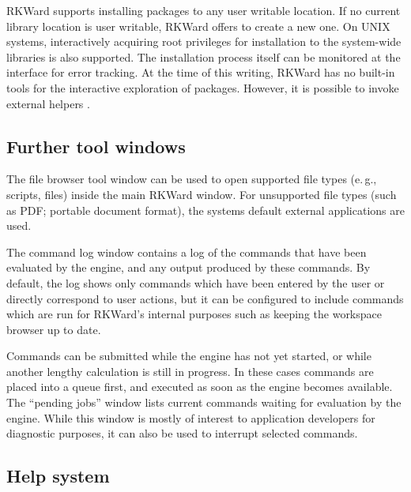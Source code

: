 RKWard supports installing packages to any user writable location. If no current
library location is user writable, RKWard offers to create a new one. 
On UNIX systems, interactively acquiring root privileges for
installation to the system-wide libraries is also supported.
The installation process
itself can be monitored at the interface for error tracking. At the time of this writing, RKWard has no
built-in tools for the interactive exploration of  packages. However, it is
possible to invoke external helpers \citep{Zhang2004}.

\subsection{Further tool windows}
\label{sec:further_tool_windows}

The file browser tool window can be
used to open supported file types (e.\,g., 
scripts,  files) inside the main RKWard
window. For unsupported file types (such as PDF; portable document format), the
systems default external applications are used.

The command log window contains a log of the commands that have been
evaluated by the  engine, and any output
produced by these commands. By default, the log shows only commands
which have been entered by the user or directly correspond to user
actions, but it can be configured to include commands which are run for
RKWard's internal purposes such as keeping the workspace browser up
to date.

Commands can be submitted while the  engine
has not yet started, or while another lengthy calculation is still
in progress. In these cases commands are placed into a queue first, and
executed as soon as the  engine becomes
available. The ``pending jobs'' window lists current  commands waiting for
evaluation by the  engine. While this
window is mostly of interest to application developers for diagnostic
purposes, it can also be used to interrupt selected commands.

\subsection{Help system}
\label{sec:help_system}

